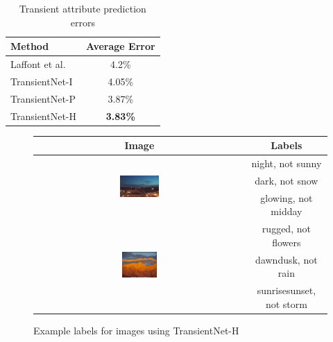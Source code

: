 \documentclass[10pt,twocolumn,letterpaper]{article}
\begin{document}
\begin{table}[t]
	\centering
	\begin{tabular}{ | l | c | }
		\hline
			Method & Average Error \\ \hline \hline
			Laffont et al.~\cite{Laffont14}& 4.2\% \\ \hline
			TransientNet-I & 4.05\% \\ \hline
			TransientNet-P & 3.87\% \\ \hline
			TransientNet-H & \textbf{3.83\%} \\ 
		\hline
	\end{tabular}
	\caption{Transient attribute prediction errors}
	\label{tbl:transient}
\end{table}

\begin{figure}[t!]
  \renewcommand{\arraystretch}{1.6}
  \centering
  \begin{tabular}[b]{| c | c |}
    \hline
    Image & Labels \\
    \hline \hline
    \multirow{3}[3]{*}[-2mm]{\includegraphics[width=0.19\textwidth]{figs/labels_1.jpg}}
      & night, not sunny \bigstrut \\
      & dark, not snow \bigstrut  \\
      & glowing, not midday \bigstrut  \\
    \hline
    \multirow{3}[3]{*}[-1mm]{\includegraphics[width=0.17\textwidth]{figs/labels_2.jpg}}
      & rugged, not flowers \bigstrut  \\
      & dawndusk, not rain \bigstrut  \\
      & sunrisesunset, not storm  \bigstrut \\
    \hline
  \end{tabular}
  \caption{Example labels for images using TransientNet-H}
  \label{fig:labels}
\end{figure}
\end{document}
